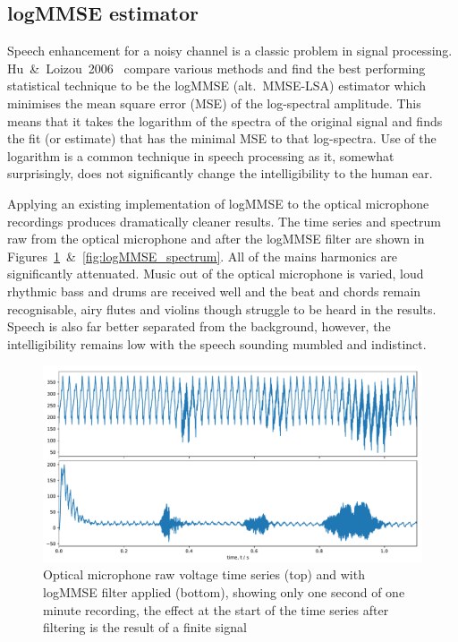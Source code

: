 \documentclass[prb,preprint]{revtex4-1}
\begin{document}
\subsection{logMMSE estimator}

Speech enhancement for a noisy channel is a classic problem in signal processing. Hu~\&~Loizou~2006~\cite{SubjectiveComparison} compare various methods and find the best performing statistical technique to be the logMMSE (alt.\ MMSE-LSA) estimator which minimises the mean square error (MSE) of the log-spectral amplitude. This means that it takes the logarithm of the spectra of the original signal and finds the fit (or estimate) that has the minimal MSE to that log-spectra. Use of the logarithm is a common technique in speech processing as it, somewhat surprisingly, does not significantly change the intelligibility to the human ear.


Applying an existing implementation of logMMSE to the optical microphone recordings produces dramatically cleaner results. The time series and spectrum raw from the optical microphone and after the logMMSE filter are shown in Figures~\ref{fig:logMMSE_timeseries}~\&~\ref{fig:logMMSE_spectrum}. All of the mains harmonics are significantly attenuated. Music out of the optical microphone is varied, loud rhythmic bass and drums are received well and the beat and chords remain recognisable, airy flutes and violins though struggle to be heard in the results. Speech is also far better separated from the background, however, the intelligibility remains low with the speech sounding mumbled and indistinct.

\begin{figure}%
	\includegraphics[width=\textwidth]{filter_timeseries_aa_melatos-cropped.pdf}
	\caption{Optical microphone raw voltage time series (top) and with logMMSE filter applied (bottom), showing only one second of one minute recording, the effect at the start of the time series after filtering is the result of a finite signal}
	\label{fig:logMMSE_timeseries}
\end{figure}
\end{document}
